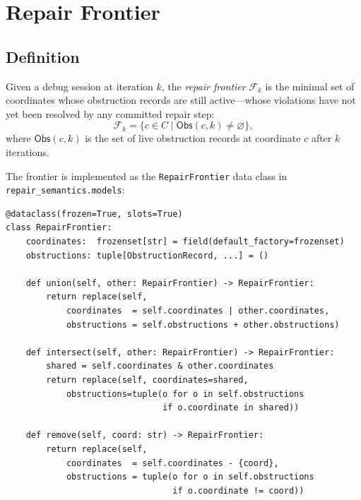 \documentclass[11pt]{article}
\newcommand{\RF}{\mathcal{F}}               %
\begin{document}
\section{Repair Frontier}
\label{sec:frontier}

\subsection{Definition}

\begin{definition}
\label{def:frontier}
Given a debug session at iteration $k$, the \emph{repair frontier} $\RF_k$
is the minimal set of coordinates whose obstruction records are still
active---\ie whose violations have not yet been resolved by any committed
repair step:
\[
  \RF_k = \{c \in C \mid \mathsf{Obs}(c, k) \neq \varnothing\},
\]
where $\mathsf{Obs}(c, k)$ is the set of live obstruction records at
coordinate $c$ after $k$ iterations.
\end{definition}

The frontier is implemented as the \texttt{RepairFrontier} data class in
\texttt{repair\_semantics.models}:

\begin{lstlisting}[style=jugeo-python,caption={RepairFrontier lattice operations (models.py).}]
@dataclass(frozen=True, slots=True)
class RepairFrontier:
    coordinates:  frozenset[str] = field(default_factory=frozenset)
    obstructions: tuple[ObstructionRecord, ...] = ()

    def union(self, other: RepairFrontier) -> RepairFrontier:
        return replace(self,
            coordinates  = self.coordinates | other.coordinates,
            obstructions = self.obstructions + other.obstructions)

    def intersect(self, other: RepairFrontier) -> RepairFrontier:
        shared = self.coordinates & other.coordinates
        return replace(self, coordinates=shared,
            obstructions=tuple(o for o in self.obstructions
                               if o.coordinate in shared))

    def remove(self, coord: str) -> RepairFrontier:
        return replace(self,
            coordinates  = self.coordinates - {coord},
            obstructions = tuple(o for o in self.obstructions
                                 if o.coordinate != coord))
\end{lstlisting}
\end{document}

